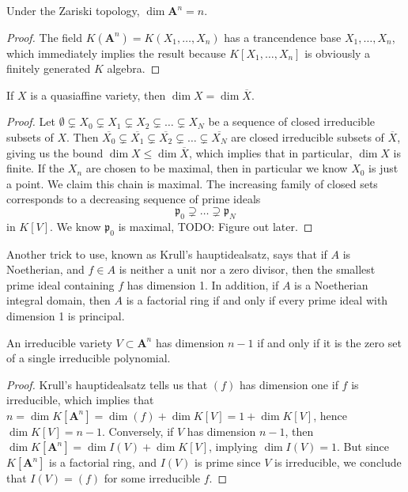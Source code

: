 \begin{theorem}
    Under the Zariski topology, $\dim \mathbf{A}^n = n$.
\end{theorem}
\begin{proof}
    The field $K(\mathbf{A}^n) = K(X_1, \dots, X_n)$ has a trancendence base $X_1, \dots, X_n$, which immediately implies the result because $K[X_1, \dots, X_n]$ is obviously a finitely generated $K$ algebra.
\end{proof}

\begin{theorem}
    If $X$ is a quasiaffine variety, then $\dim X = \dim \overline{X}$.
\end{theorem}
\begin{proof}
    Let $\emptyset \subsetneq X_0 \subsetneq X_1 \subsetneq X_2 \subsetneq \dots \subsetneq X_N$ be a sequence of closed irreducible subsets of $X$. Then $\overline{X_0} \subsetneq \overline{X_1} \subsetneq \overline{X_2} \subsetneq \dots \subsetneq \overline{X_N}$ are closed irreducible subsets of $\overline{X}$, giving us the bound $\dim X \leq \dim \overline{X}$, which implies that in particular, $\dim X$ is finite. If the $X_n$ are chosen to be maximal, then in particular we know $X_0$ is just a point. We claim this chain is maximal. The increasing family of closed sets corresponds to a decreasing sequence of prime ideals
    \[ \mathfrak{p}_0 \supsetneq \dots \supsetneq \mathfrak{p}_N \]
    in $K[V]$. We know $\mathfrak{p}_0$ is maximal, TODO: Figure out later.
\end{proof}

Another trick to use, known as Krull's hauptidealsatz, says that if $A$ is Noetherian, and $f \in A$ is neither a unit nor a zero divisor, then the smallest prime ideal containing $f$ has dimension 1. In addition, if $A$ is a Noetherian integral domain, then $A$ is a factorial ring if and only if every prime ideal with dimension 1 is principal.

\begin{theorem}
    An irreducible variety $V \subset \mathbf{A}^n$ has dimension $n-1$ if and only if it is the zero set of a single irreducible polynomial.
\end{theorem}
\begin{proof}
    Krull's hauptidealsatz tells us that $(f)$ has dimension one if $f$ is irreducible, which implies that $n = \dim K[\mathbf{A}^n] = \dim (f) + \dim K[V] = 1 + \dim K[V]$, hence $\dim K[V] = n-1$. Conversely, if $V$ has dimension $n-1$, then $\dim K[\mathbf{A}^n] = \dim I(V) + \dim K[V]$, implying $\dim I(V) = 1$. But since $K[\mathbf{A}^n]$ is a factorial ring, and $I(V)$ is prime since $V$ is irreducible, we conclude that $I(V) = (f)$ for some irreducible $f$.
\end{proof}

